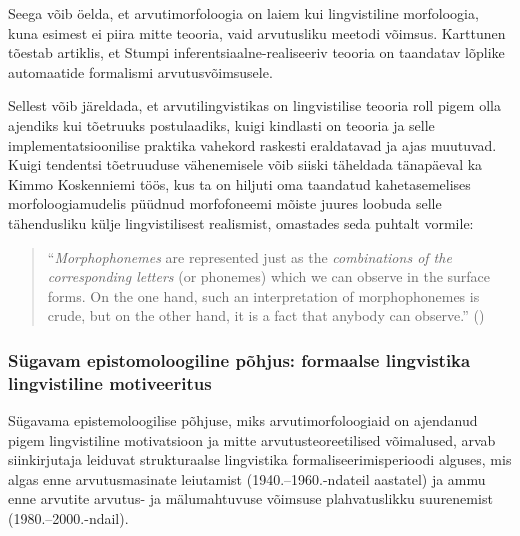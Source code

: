 \documentclass[12pt,a4paper]{article}
\begin{document}
Seega võib öelda, et arvutimorfoloogia on laiem kui lingvistiline morfoloogia, kuna esimest ei piira mitte teooria, vaid arvutusliku meetodi võimsus. Karttunen tõestab artiklis, et Stumpi inferentsiaalne-realiseeriv teooria on taandatav lõplike automaatide formalismi arvutusvõimsusele.%

Sellest võib järeldada, et arvutilingvistikas on lingvistilise teooria roll pigem olla ajendiks kui tõetruuks postulaadiks, kuigi kindlasti on teooria ja selle implementatsioonilise praktika vahekord raskesti eraldatavad ja ajas muutuvad. Kuigi tendentsi tõetruuduse vähenemisele võib siiski täheldada tänapäeval ka Kimmo Koskenniemi töös, kus ta on hiljuti oma taandatud kahetasemelises morfoloogiamudelis püüdnud morfofoneemi mõiste juures loobuda selle tähendusliku külje lingvistilisest realismist, omastades seda puhtalt vormile:
\begin{quote}
  ``\textit{Morphophonemes} are represented just as the \textit{combinations of the corresponding letters} (or phonemes) which we can observe in the surface forms. On the one hand, such an interpretation of morphophonemes is crude, but on the other hand, it is a fact that anybody can observe.'' (\cite[157]{koskenniemi_informal_2013})
\end{quote}

\subsubsection{Sügavam epistomoloogiline põhjus: formaalse lingvistika lingvistiline motiveeritus}
Sügavama epistemoloogilise põhjuse, miks arvutimorfoloogiaid on ajendanud pigem lingvistiline motivatsioon ja mitte arvutusteoreetilised võimalused, arvab siinkirjutaja leiduvat strukturaalse lingvistika formaliseerimisperioodi alguses, mis algas enne arvutusmasinate leiutamist (1940.--1960.-ndateil aastatel) ja ammu enne arvutite arvutus- ja mälumahtuvuse võimsuse plahvatuslikku suurenemist (1980.--2000.-ndail). %
\end{document}
